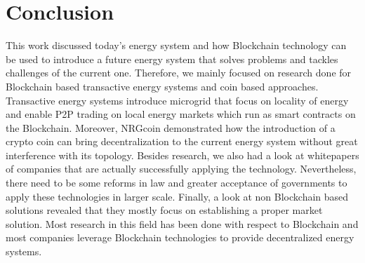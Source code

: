 \documentclass[runningheads]{llncs}
\begin{document}
\section{Conclusion}
This work discussed today's energy system and how Blockchain technology can be used to introduce a future energy system that solves problems and tackles challenges of the current one. Therefore, we mainly focused on research done for Blockchain based transactive energy systems and coin based approaches. Transactive energy systems introduce microgrid that focus on locality of energy and enable P2P trading on local energy markets which run as smart contracts on the Blockchain. Moreover, NRGcoin demonstrated how the introduction of a crypto coin can bring decentralization to the current energy system without great interference with its topology. Besides research, we also had a look at whitepapers of companies that are actually successfully applying the technology. Nevertheless, there need to be some reforms in law and greater acceptance of governments to apply these technologies in larger scale. Finally, a look at non Blockchain based solutions revealed that they mostly focus on establishing a proper market solution. Most research in this field has been done with respect to Blockchain and most companies leverage Blockchain technologies to provide decentralized energy systems.
\end{document}

